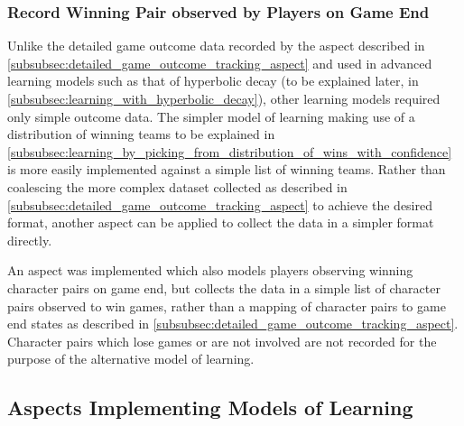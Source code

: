 \subsubsection{Record Winning Pair observed by Players on Game
End}\label{subsubsec:aspect_to_observe_winning_pair} Unlike the detailed game
outcome data recorded by the aspect described in
\cref{subsubsec:detailed_game_outcome_tracking_aspect} and used in advanced
learning models such as that of hyperbolic decay (to be explained later, in
\cref{subsubsec:learning_with_hyperbolic_decay}), other learning models required
only simple outcome data. The simpler model of learning making use of a
distribution of winning teams to be explained in
\cref{subsubsec:learning_by_picking_from_distribution_of_wins_with_confidence}
is more easily implemented against a simple list of winning teams. Rather than
coalescing the more complex dataset collected as described in
\cref{subsubsec:detailed_game_outcome_tracking_aspect} to achieve the desired
format, another aspect can be applied to collect the data in a simpler format
directly.

An aspect was implemented which also models players observing winning character
pairs on game end, but collects the data in a simple list of character pairs
observed to win games, rather than a mapping of character pairs to game end
states as described in \cref{subsubsec:detailed_game_outcome_tracking_aspect}.
Character pairs which lose games or are not involved are not recorded for the
purpose of the alternative model of learning.

\subsection{Aspects Implementing Models of Learning}\label{subsec:aspects_modelling_learning}


